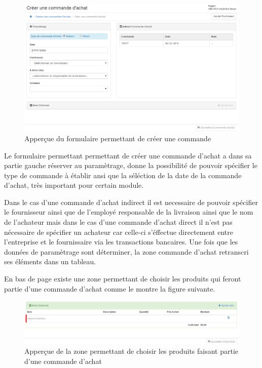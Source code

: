 \documentclass[12pt,a4paper]{report}
\begin{document}
\begin{figure}[h]
\begin{center}
\includegraphics[width=12cm]{pic/OrdreAchatForm.png}
\end{center}
\caption{Apperçue du formulaire permettant de créer une commande}
\label{Apperçue du formulaire permettant de créer une commande}
\end{figure}

Le formulaire permettant permettant de créer une commande d'achat a dans sa partie gauche réserver au paramètrage, donne la possibilité de pouvoir spécifier le type de commande à établir ansi que la séléction de la date de la commande d'achat, très important pour certain module.

Dans le cas d'une commande d'achat indirect il est necessaire de pouvoir spécifier le fournisseur ainsi que de l'employé responsable de la livraison ainsi que le nom de l'achateur mais dans le cas d'une commande d'achat direct il n'est pas nécessaire de spécifier un achateur car celle-ci s'éffectue directement entre l'entreprise et le fournissaire via les transactions bancaires. Une fois que les données de paramètrage sont déterminer, la zone commande d'achat retranscri ses éléments dans un tableau.

En bas de page existe une zone permettant de choisir les produits qui feront partie d'une commande d'achat comme le montre la figure suivante.

\begin{figure}[h]
\begin{center}
\includegraphics[width=12cm]{pic/ItemsOrdonnees.png}
\end{center}
\caption{Apperçue de la zone permettant de choisir les produits faisant partie d'une commande d'achat}
\label{Apperçue de la zone permettant de choisir les produits faisant partie d'une commande d'achat}
\end{figure} 
\end{document}
